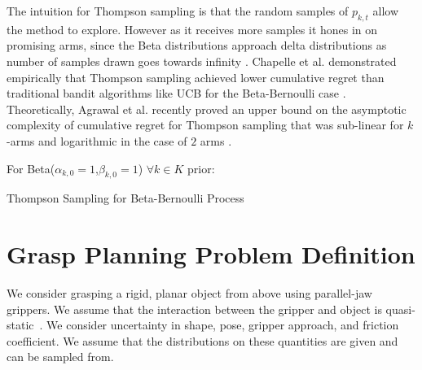 \documentclass[10pt, conference]{ieeeconf}      %
\begin{document}
The intuition for Thompson sampling is that the random samples of $p_{k,t}$ allow the method to explore. However as it receives more samples it hones in on promising arms, since the Beta distributions approach delta distributions as number of samples drawn goes towards infinity \cite{goetschalckx2011continuous}. Chapelle et al. demonstrated empirically that Thompson sampling achieved lower cumulative regret than traditional bandit algorithms like UCB for the Beta-Bernoulli case \cite{chapelle2011empirical}. Theoretically, Agrawal et al. recently proved an upper bound on the asymptotic complexity of  cumulative regret for  Thompson sampling that was sub-linear  for $k$ -arms and logarithmic in the case of $2$ arms  \cite{agrawal2011analysis}. 

\begin{algorithm}
 For Beta($\alpha_{k,0}=1$,$\beta_{k,0}=1$) $\forall k \in K$ prior: \\
 \caption{Thompson Sampling for Beta-Bernoulli Process}
\end{algorithm}


\section{Grasp Planning Problem Definition}
We consider grasping a rigid, planar object from above using parallel-jaw grippers.
We assume that the interaction between the gripper and object is quasi-static~\cite{kehoe2012estimating, kehoe2012toward}.
We consider uncertainty in shape, pose, gripper approach, and friction coefficient. We assume that the distributions on these quantities are given and can be sampled from. 
\end{document}
